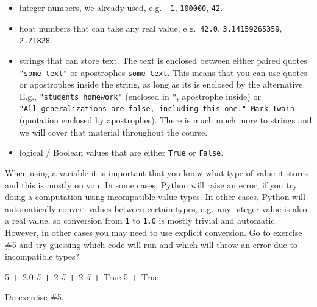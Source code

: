 \documentclass[
]{book}
\newenvironment{Shaded}{\begin{snugshade}}{\end{snugshade}}
\newcommand{\CommentTok}[1]{\textcolor[rgb]{0.56,0.35,0.01}{\textit{#1}}}
\newcommand{\DecValTok}[1]{\textcolor[rgb]{0.00,0.00,0.81}{#1}}
\newcommand{\FloatTok}[1]{\textcolor[rgb]{0.00,0.00,0.81}{#1}}
\newcommand{\OperatorTok}[1]{\textcolor[rgb]{0.81,0.36,0.00}{\textbf{#1}}}
\newcommand{\StringTok}[1]{\textcolor[rgb]{0.31,0.60,0.02}{#1}}
\newcommand{\VariableTok}[1]{\textcolor[rgb]{0.00,0.00,0.00}{#1}}
\providecommand{\tightlist}{%
  \setlength{\itemsep}{0pt}\setlength{\parskip}{0pt}}
\begin{document}
\begin{itemize}
\tightlist
\item
  integer numbers, we already used, e.g.~\texttt{-1}, \texttt{100000}, \texttt{42}.
\item
  float numbers that can take any real value, e.g.~\texttt{42.0}, \texttt{3.14159265359}, \texttt{2.71828}.
\item
  strings that can store text. The text is enclosed between either paired quotes \texttt{"some\ text"} or apostrophes \texttt{\textquotesingle{}some\ text\textquotesingle{}}. This means that you can use quotes or apostrophes inside the string, as long as its is enclosed by the alternative. E.g., \texttt{"students\textquotesingle{}\ homework"} (enclosed in \texttt{"}, apostrophe \texttt{\textquotesingle{}} inside) or \texttt{\textquotesingle{}"All\ generalizations\ are\ false,\ including\ this\ one."\ Mark\ Twain\textquotesingle{}} (quotation enclosed by apostrophes). There is much much more to strings and we will cover that material throughout the course.
\item
  logical / Boolean values that are either \texttt{True} or \texttt{False}.
\end{itemize}

When using a variable it is important that you know what type of value it stores and this is mostly on you. In some cases, Python will raise an error, if you try doing a computation using incompatible value types. In other cases, Python will automatically convert values between certain types, e.g.~any integer value is also a real value, so conversion from \texttt{1} to \texttt{1.0} is mostly trivial and automatic. However, in other cases you may need to use explicit conversion. Go to exercise \#5 and try guessing which code will run and which will throw an error due to incompatible types?

\begin{Shaded}
\begin{Highlighting}[]
\DecValTok{5} \OperatorTok{+} \FloatTok{2.0}
\CommentTok{\textquotesingle{}5\textquotesingle{}} \OperatorTok{+} \DecValTok{2}
\CommentTok{\textquotesingle{}5\textquotesingle{}} \OperatorTok{+} \StringTok{\textquotesingle{}2\textquotesingle{}}
\CommentTok{\textquotesingle{}5\textquotesingle{}} \OperatorTok{+} \VariableTok{True}
\DecValTok{5} \OperatorTok{+} \VariableTok{True}
\end{Highlighting}
\end{Shaded}

Do exercise \#5.
\end{document}
